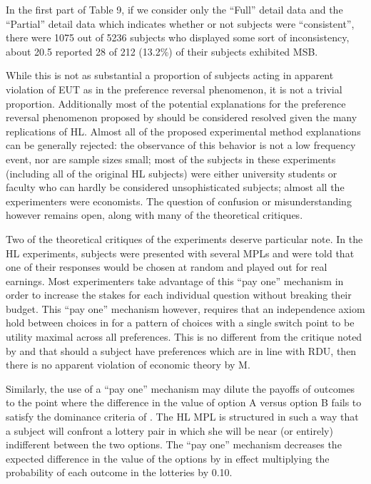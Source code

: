 In the first part of Table 9, if we consider only the \enquote{Full} detail data and the \enquote{Partial} detail data which indicates whether or not subjects were \enquote{consistent}, there were 1075 out of 5236 subjects who displayed some sort of inconsistency, about 20.5%
\textcite[1647]{Holt2002} reported 28 of 212 (13.2\%) of their subjects exhibited MSB.

While this is not as substantial a proportion of subjects acting in apparent violation of EUT as in the \textcite{Grether1979} preference reversal phenomenon, it is not a trivial proportion.
Additionally most of the potential explanations for the preference reversal phenomenon proposed by \textcite{Grether1979} should be considered resolved given the many replications of HL.
Almost all of the proposed experimental method explanations can be generally rejected: the observance of this behavior is not a low frequency event, nor are sample sizes small; most of the subjects in these experiments (including all of the original HL subjects) were either university students or faculty who can hardly be considered unsophisticated subjects; almost all the experimenters were economists.
The question of confusion or misunderstanding however remains open, along with many of the theoretical critiques.

Two of the theoretical critiques of the \textcite{Grether1979} experiments deserve particular note.
In the HL experiments, subjects were presented with several MPLs and were told that one of their responses would be chosen at random and played out for real earnings.
Most experimenters take advantage of this \enquote{pay one} mechanism in order to increase the stakes for each individual question without breaking their budget.
This \enquote{pay one} mechanism however, requires that an independence axiom hold between choices in for a pattern of choices with a single switch point to be utility maximal across all preferences.
This is no different from the critique noted by \textcite{Holt1986} and \textcite{Karni1987} that should a subject have preferences which are in line with RDU, then there is no apparent violation of economic theory by M.

Similarly, the use of a \enquote{pay one} mechanism may dilute the payoffs of outcomes to the point where the difference in the value of option A versus option B fails to satisfy the dominance criteria of \textcite{Smith1982}.
The HL MPL is structured in such a way that a subject will confront a lottery pair in which she will be near (or entirely) indifferent between the two options.
The \enquote{pay one} mechanism decreases the expected difference in the value of the options by in effect multiplying the probability of each outcome in the lotteries by 0.10. 

